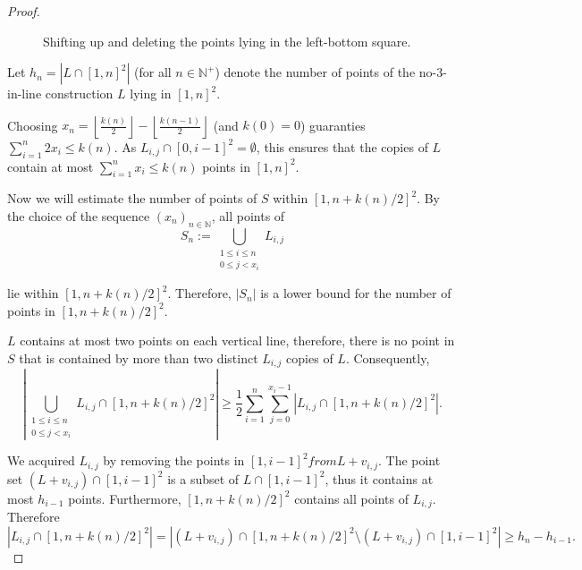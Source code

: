 \documentclass[11pt,a4paper]{article}
\numberwithin{equation}{section}
\newcommand{\nn}{\mathbb{N}}
\begin{document}
\begin{proof}
\begin{figure}[h!!]
\caption{Shifting up and deleting the points lying in the left-bottom square.}
\label{fig:shift}
\end{figure}

Let $h_n = |L \cap [1,n]^2|$ (for all $n\in \nn^+$) denote the number of points of the no-3-in-line construction $L$ lying in $[1,n]^2$.

Choosing $x_n = \left\lfloor \frac{k(n)}{2} \right\rfloor - \left\lfloor \frac{k(n-1)}{2} \right\rfloor$ (and $k(0)=0$) guaranties $\sum_{i=1}^{n} 2x_i \leq k(n)$. As $L_{i,j}\cap [0, i-1]^2 = \emptyset$, this ensures that the copies of $L$ contain at most $\sum _{i=1}^{n} x_i\le k(n)$ points in $[1,n]^2$.

\medskip
\noindent Now we will estimate the number of points of $S$ within $[1, n +k(n)/2]^2$. By the choice of the sequence $(x_n)_{n\in\nn}$, all points of 
$$S_n:=\bigcup_{\substack{1 \le i\le n  \\ 0 \le j < x_i} }L_{i,j}$$

\noindent lie within $[1, n+k(n)/2]^2$. Therefore, $|S_n|$ is a lower bound for the number of points in $[1, n+k(n)/2]^2$.

$L$ contains at most two points on each vertical line, therefore, there is no point in $S$ that is contained by more than two distinct $L_{i,j}$ copies of $L$.  
Consequently,
$$\left | \bigcup_{\substack{1\le i \le n \\0\le j < x_i}}L_{i,j}\cap [1,n+k(n)/2]^2\right | \ge \frac{1}{2} \sum _{i = 1}^n \sum _{j = 0}^{x_i-1} |L_{i,j}\cap [1,n+k(n)/2]^2|.$$



We acquired $L_{i,j}$ by removing the points in $[1, i-1]^2 from  L+v_{i,j}$. The point set $(L+v_{i,j})\cap [1, i-1]^2$ is a subset of $L\cap [1,i-1]^2$, thus it contains at most $h_{i-1}$ points. Furthermore, $[1, n+k(n)/2]^2$ contains all points of $L_{i,j}$. Therefore
$$\left|L_{i,j}\cap [1,n+k(n)/2]^2\right|=\left|(L+v_{i,j})\cap [1,n+k(n)/2]^2 \setminus (L+v_{i,j}) \cap[1, i-1]^2\right| \ge h_n-h_{i-1}.$$ 



\end{proof}
\end{document}
